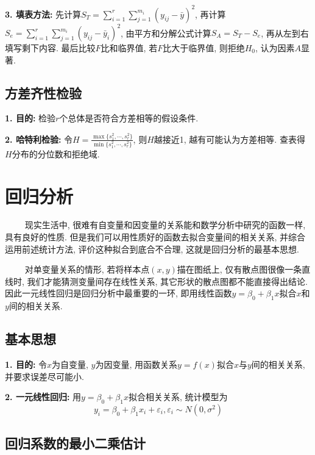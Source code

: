 \textbf{3. 填表方法: }先计算$S_T=\sum\limits_{i=1}^r\sum\limits_{j=1}^{m_i} (y_{ij}-\bar{y})^2$, 再计算$S_e=\sum\limits_{i=1}^r\sum\limits_{j=1}^{m_i}(y_{ij}-\bar{y}_i)^2$, 由平方和分解公式计算$S_A=S_T-S_e$, 再从左到右填写剩下内容. 最后比较$F$比和临界值, 若$F$比大于临界值, 则拒绝$H_0$, 认为因素$A$显著.

\subsection{方差齐性检验}

\textbf{1. 目的: }检验$r$个总体是否符合方差相等的假设条件.

\textbf{2. 哈特利检验: }令$H=\frac{\max\{s_1^2,\cdots,s_r^2\}}{\min\{s_1^2,\cdots,s_r^2\}}$, 则$H$越接近1, 越有可能认为方差相等. 查表得$H$分布的分位数和拒绝域.

\section{回归分析}

\begin{tcolorbox}[colback=red!5,colframe=red!75!black]
    ~~~~ 现实生活中, 很难有自变量和因变量的关系能和数学分析中研究的函数一样, 具有良好的性质. 但是我们可以用性质好的函数去拟合变量间的相关关系, 并综合运用前述统计方法, 评价这种拟合到底合不合理, 这就是回归分析的最基本思想.

    ~~~~ 对单变量关系的情形, 若将样本点$(x,y)$描在图纸上, 仅有散点图很像一条直线时, 我们才能猜测变量间存在线性关系, 其它形状的散点图都不能直接得出结论. 因此一元线性回归是回归分析中最重要的一环, 即用线性函数$y=\beta_0+\beta_1 x$拟合$x$和$y$间的相关关系. 
\end{tcolorbox}

\subsection{基本思想}

\textbf{1. 目的: }令$x$为自变量, $y$为因变量, 用函数关系$y=f(x)$拟合$x$与$y$间的相关关系, 并要求误差尽可能小.

\textbf{2. 一元线性回归: }用$y=\beta_0+\beta_1 x$拟合相关关系, 统计模型为
\begin{equation*}
    y_i=\beta_0+\beta_1 x_i +\varepsilon_i , \varepsilon_i \sim N(0,\sigma^2)
\end{equation*}

\subsection{回归系数的最小二乘估计}

